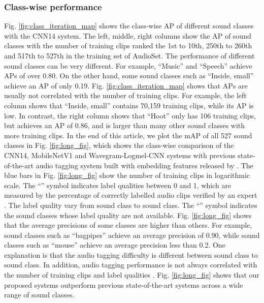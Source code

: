 \documentclass[journal]{IEEEtran}
\newcommand{\qk}[1] {{\color{black} #1}}
\begin{document}
\subsubsection{Class-wise performance}
Fig. \ref{fig:class_iteration_map} shows the class-wise AP of different sound classes with the CNN14 system. The left, middle, right columns show the AP of sound classes with the number of training clips ranked the 1st to 10th, 250th to 260th and 517th to 527th in the training set of AudioSet. The performance of different sound classes can be very different. For example, ``Music'' and ``Speech'' achieve APs of over 0.80. On the other hand, some sound classes such as ``Inside, small'' achieve an AP of only 0.19. Fig. \ref{fig:class_iteration_map} shows that APs are usually not correlated with the number of training clips. For example, the left column shows that ``Inside, small'' contains 70,159 training clips, while its AP is low. In contrast, the right column shows that ``Hoot'' only has 106 training clips, but achieves an AP of 0.86, and is larger than many other sound classes with more training clips. In the end of this article, we plot the mAP of all 527 sound classes in Fig. \ref{fig:long_fig}, which shows the class-wise comparison of the CNN14, MobileNetV1 and Wavegram-Logmel-CNN systems with previous state-of-the-art audio tagging system \cite{kong2019weakly} built with embedding features released by \cite{gemmeke2017audio}. The blue bars in Fig. \ref{fig:long_fig} show the number of training clips in logarithmic scale. \qk{The ``'' symbol indicates label qualities between 0 and 1, which are measured by the percentage of correctly labelled audio clips verified by an expert \cite{gemmeke2017audio}. The label quality vary from sound class to sound class.} The ``'' symbol indicates the sound classes whose label quality are not available. \qk{Fig. \ref{fig:long_fig} shows that the average precisions of some classes are higher than others. For example, sound classes such as ``bagpipes'' achieve an average precision of 0.90, while sound classes such as ``mouse'' achieve an average precision less than 0.2. One explanation is that the audio tagging difficulty is different between sound class to sound class. In addition, audio tagging performance is not always correlated with the number of training clips and label qualities \cite{kong2019weakly}.} Fig. \ref{fig:long_fig} shows that our proposed systems outperform previous state-of-the-art systems \cite{kong2018audio, yu2018multi} across a wide range of sound classes.  
\end{document}
